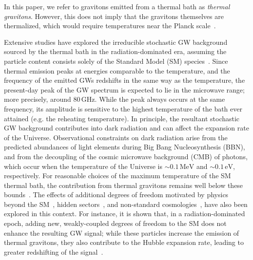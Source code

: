 In this paper, we refer to gravitons emitted from a thermal bath as {\it thermal gravitons}. However, this does not imply that the gravitons themselves are thermalized, which would require temperatures near the Planck scale~\cite{Kolb:1990vq}.

Extensive studies have explored the irreducible stochastic GW background sourced by the thermal bath in the radiation-dominated era, assuming the particle content consists solely of the Standard Model (SM) species~\cite{Ghiglieri:2015nfa,Ghiglieri:2020mhm,Ringwald:2020ist}. Since thermal emission peaks at energies comparable to the temperature, and the frequency of the emitted GWs redshifts in the same way as the temperature, the present-day peak of the GW spectrum is expected to lie in the microwave range; more precisely, around 80\,GHz. While the peak always occurs at the same frequency, its amplitude is sensitive to the highest temperature of the bath ever attained (e.g. the reheating temperature). In principle, the resultant stochastic GW background contributes into dark radiation and can affect the expansion rate of the Universe. Observational constraints on dark radiation arise from the predicted abundances of light elements during Big Bang Nucleosynthesis (BBN), and from the decoupling of the cosmic microwave background (CMB) of photons, which occur when the temperature of the Universe is $\sim 0.1\,\text{MeV}$ and $\sim 0.1\,\text{eV}$, respectively. For reasonable choices of the maximum temperature of the SM thermal bath, the contribution from thermal gravitons remains well below these bounds~\cite{Ringwald:2020ist}.
The effects of additional degrees of freedom motivated by physics beyond the SM~\cite{Ringwald:2020ist}, hidden sectors~\cite{Drewes:2023oxg}, and non-standard cosmologies~\cite{Muia:2023wru,Bernal:2024jim,Ai:2025fqw}, have also been explored in this context. For instance,  it is shown that, in a radiation-dominated epoch, adding new, weakly-coupled degrees of freedom to the SM does not enhance the resulting GW signal; while these particles increase the emission of thermal gravitons, they also contribute to the Hubble expansion rate, leading to greater redshifting of the signal~\cite{Ringwald:2020ist,Muia:2023wru}.

\medskip

